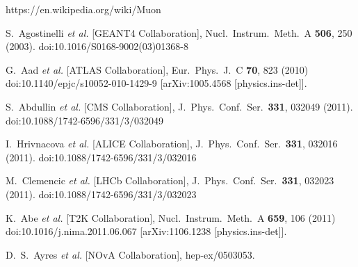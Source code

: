 \documentclass[aps,prd,superscriptaddress,nofootinbib,preprint]{ctexart}
\begin{document}
\begin{CJK}{UTF8}{gbsn}
\begin{thebibliography}{123456}
https://en.wikipedia.org/wiki/Muon

  S.~Agostinelli {\it et al.} [GEANT4 Collaboration],
  Nucl.\ Instrum.\ Meth.\ A {\bf 506}, 250 (2003).
  doi:10.1016/S0168-9002(03)01368-8

  G.~Aad {\it et al.} [ATLAS Collaboration],
  Eur.\ Phys.\ J.\ C {\bf 70}, 823 (2010)
  doi:10.1140/epjc/s10052-010-1429-9
  [arXiv:1005.4568 [physics.ins-det]].

  S.~Abdullin {\it et al.} [CMS Collaboration],
  J.\ Phys.\ Conf.\ Ser.\  {\bf 331}, 032049 (2011).
  doi:10.1088/1742-6596/331/3/032049

  I.~Hrivnacova {\it et al.} [ALICE Collaboration],
  J.\ Phys.\ Conf.\ Ser.\  {\bf 331}, 032016 (2011).
  doi:10.1088/1742-6596/331/3/032016

  M.~Clemencic {\it et al.} [LHCb Collaboration],
  J.\ Phys.\ Conf.\ Ser.\  {\bf 331}, 032023 (2011).
  doi:10.1088/1742-6596/331/3/032023

  K.~Abe {\it et al.} [T2K Collaboration],
  Nucl.\ Instrum.\ Meth.\ A {\bf 659}, 106 (2011)
  doi:10.1016/j.nima.2011.06.067
  [arXiv:1106.1238 [physics.ins-det]].

  D.~S.~Ayres {\it et al.} [NOvA Collaboration],
  hep-ex/0503053.


\end{thebibliography}
\end{CJK}
\end{document}
